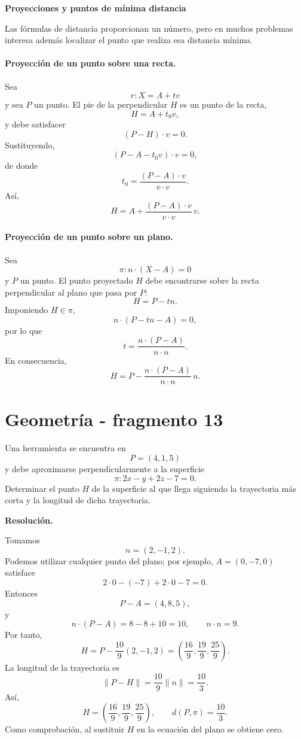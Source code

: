 \textbf{Proyecciones y puntos de mínima distancia}

Las fórmulas de distancia proporcionan un número, pero en muchos problemas interesa además localizar el punto que realiza esa distancia mínima.

\paragraph{Proyección de un punto sobre una recta.}
Sea
\[
r:X=A+tv
\]
y sea $P$ un punto. El pie de la perpendicular $H$ es un punto de la recta,
\[
H=A+t_0v,
\]
y debe satisfacer
\[
(P-H)\cdot v=0.
\]
Sustituyendo,
\[
(P-A-t_0v)\cdot v=0,
\]
de donde
\[
\boxed{
 t_0=\frac{(P-A)\cdot v}{v\cdot v}.}
\]
Así,
\[
\boxed{
 H=A+\frac{(P-A)\cdot v}{v\cdot v}\,v.}
\]

\paragraph{Proyección de un punto sobre un plano.}
Sea
\[
\pi:n\cdot(X-A)=0
\]
y $P$ un punto. El punto proyectado $H$ debe encontrarse sobre la recta perpendicular al plano que pasa por $P$:
\[
H=P-tn.
\]
Imponiendo $H\in\pi$,
\[
n\cdot(P-tn-A)=0,
\]
por lo que
\[
t=\frac{n\cdot(P-A)}{n\cdot n}.
\]
En consecuencia,
\[
\boxed{
 H=P-\frac{n\cdot(P-A)}{n\cdot n}\,n.}
\]


\section{Geometría - fragmento 13}
\begin{solvedexercise}
Una herramienta se encuentra en
\[
P=(4,1,5)
\]
y debe aproximarse perpendicularmente a la superficie
\[
\pi:2x-y+2z-7=0.
\]
Determinar el punto $H$ de la superficie al que llega siguiendo la trayectoria más corta y la longitud de dicha trayectoria.

\textbf{Resolución.}\par\smallskip
Tomamos
\[
n=(2,-1,2).
\]
Podemos utilizar cualquier punto del plano; por ejemplo, $A=(0,-7,0)$ satisface
\[
2\cdot0-(-7)+2\cdot0-7=0.
\]
Entonces
\[
P-A=(4,8,5),
\]
y
\[
n\cdot(P-A)=8-8+10=10,
\qquad
n\cdot n=9.
\]
Por tanto,
\[
H=P-\frac{10}{9}(2,-1,2)
=\left(\frac{16}{9},\frac{19}{9},\frac{25}{9}\right).
\]
La longitud de la trayectoria es
\[
\|P-H\|
=\frac{10}{9}\|n\|
=\frac{10}{3}.
\]
Así,
\[
\boxed{
H=\left(\frac{16}{9},\frac{19}{9},\frac{25}{9}\right),
\qquad
d(P,\pi)=\frac{10}{3}.}
\]
Como comprobación, al sustituir $H$ en la ecuación del plano se obtiene cero.
\end{solvedexercise}


